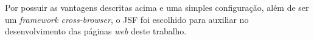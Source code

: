 \par Por possuir as vantagens descritas acima e uma simples configuração, além de ser um 
\textit{framework cross-browser\footnotemark[5]}, o JSF foi escolhido para
auxiliar no desenvolvimento das páginas \textit{web} deste trabalho.







